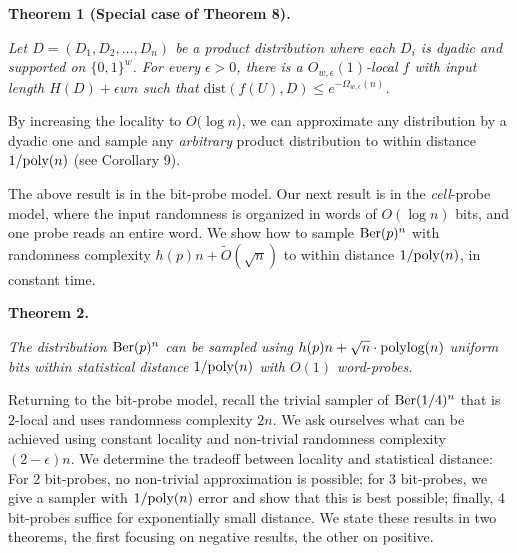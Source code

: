 \documentclass[10pt,a4paper]{article}
\begin{document}


\par\medskip\noindent\textbf{
\textbf{Theorem 1}\textbf{ }(Special case of Theorem 8)\textbf{.}
}\par



\emph{Let $D=(D_{1},D_{2},\ldots,D_{n})$ be a product distribution where each $D_{i}$ is dyadic and supported on $\{0,1\}^{w}$.
For every $\epsilon>0$, there is a $O_{w,\epsilon}(1)$-local $f$ with input length $H(D)+\epsilon wn$ such that $\mathrm{dist}(f(U),D)\leq e^{-\Omega_{w,\epsilon}(n)}$.}\par






By increasing the locality to $O(\log n$), we can approximate any distribution by a dyadic one and sample any \emph{arbitrary} product distribution to within distance $1/\textnormal{poly}(n)$ (see Corollary 9).\par




The above result is in the bit-probe model. Our next result is in the \emph{cell}-probe model, where the input randomness is organized in words of $O(\log n)$ bits, and one probe reads an entire word. We show how to sample $\textnormal{Ber}(p)^{n}$ with randomness complexity $h(p)n+\widetilde{O}({\sqrt{n}})$ to within distance $1/\textnormal{poly}(n)$, in constant time.\par





\par\medskip\noindent\textbf{
\textbf{Theorem 2}\textbf{.}
}\par



\emph{The distribution $\textnormal{Ber}(p)^{n}$ can be sampled using $h(p)n+\sqrt{n}\cdot\textnormal{polylog}(n)$ uniform bits within statistical distance $1/\textnormal{poly}(n)$ with $O(1)$ word-probes.}\par






Returning to the bit-probe model, recall the trivial sampler of $\textnormal{Ber}(1/4)^{n}$ that is $2$-local and uses randomness complexity $2n$. We ask ourselves what can be achieved using constant locality and non-trivial randomness complexity $(2-\epsilon)n$.
We determine the tradeoff between locality and statistical distance:
For $2$ bit-probes, no non-trivial approximation is possible; for 3 bit-probes, we give a sampler with $1/\textnormal{poly}(n)$ error and show that this is best possible; finally, 4 bit-probes suffice for exponentially small distance. We state these results in two theorems, the first focusing on negative results, the other on positive.\par
\end{document}
